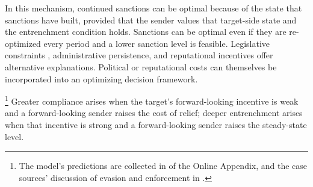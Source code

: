  In this mechanism, continued sanctions
can be optimal because of the state that sanctions have built, provided that the sender
values that target-side state and the entrenchment condition holds. Sanctions can be
optimal even if they are re-optimized every period and a lower sanction level is
feasible. Legislative constraints \citep{HalcoussisKaempferLowenberg2021}, administrative
persistence, and reputational incentives offer alternative explanations. Political or
reputational costs can themselves be incorporated into an optimizing decision
framework.

\footnote{The
model's predictions are collected in  of the Online Appendix,
and the case sources' discussion of evasion and enforcement in
.} Greater
compliance arises when the target's forward-looking incentive is weak and a
forward-looking sender raises the cost of relief; deeper entrenchment arises when that
incentive is strong and a forward-looking sender raises the steady-state level.

